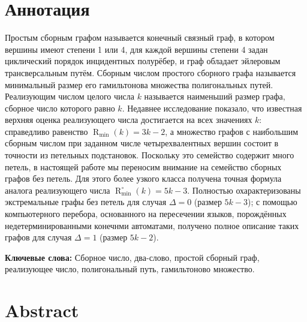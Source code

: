 \documentclass{article}
\theoremstyle{definition}
\newcommand{\D}{\Delta}
\newcommand{\Rmin}{\operatorname{R}_{\min}}
\newcommand{\Romin}{\operatorname{R}_{\min}^\circ}
\begin{document}

\newpage
\setcounter{page}{2}


{
	\hypersetup{linkcolor=black}
	\tableofcontents
}

\newpage


\section*{Аннотация}

Простым сборным графом называется конечный связный граф, в котором вершины имеют степени 1 или 4, для каждой вершины степени 4 задан циклический порядок инцидентных полурёбер, и граф обладает эйлеровым трансверсальным путём.
Сборным числом простого сборного графа называется минимальный размер его гамильтонова множества полигональных путей. Реализующим числом целого числа \(k\) называется наименьший размер графа, сборное число которого равно \(k\). Недавнее исследование показало, что известная верхняя оценка реализующего числа достигается на всех 
значениях \(k\): справедливо равенство 
\(\Rmin(k) = 3k - 2\), а множество графов 
с наибольшим сборным числом при заданном числе четырехвалентных вершин состоит в точности из петельных подстановок. Поскольку это семейство содержит 
много петель, в настоящей работе мы переносим внимание на семейство сборных графов без петель. Для этого более узкого класса получена точная формула аналога реализующего числа 
\(\Romin(k) = 5k - 3\). Полностью охарактеризованы экстремальные графы без петель для случая \(\D = 0\) (размер \(5k-3\)); 
с помощью компьютерного перебора, основанного на пересечении языков, порождённых недетерминированными конечнми автоматами, получено полное описание таких графов для случая \(\D = 1\) (размер \(5k-2\)).


\medskip
\noindent\textbf{Ключевые слова:} Сборное число, два-слово, простой сборный граф, реализующее число, полигональный путь, гамильтоново множество.

\section*{Abstract}
\end{document}
